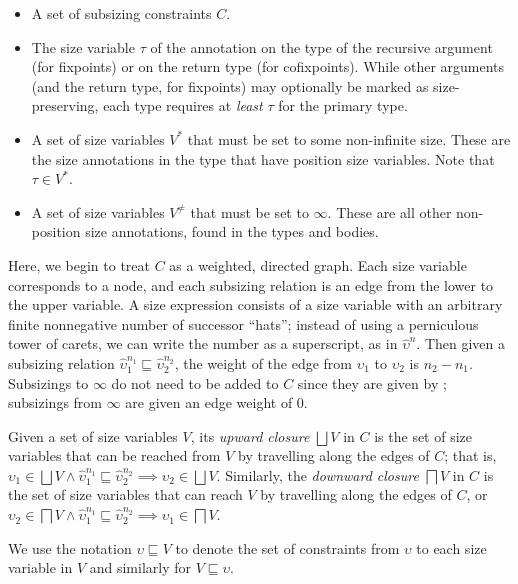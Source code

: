 \begin{itemize}
  \item A set of subsizing constraints $C$.
  \item The size variable $\tau$ of the annotation on the type of the recursive argument (for fixpoints) or on the return type (for cofixpoints). While other arguments (and the return type, for fixpoints) may optionally be marked as size-preserving, each \cofixpoint type requires at \textit{least} $\tau$ for the primary \corecursive type.
  \item A set of size variables $V^*$ that must be set to some non-infinite size.
    These are the size annotations in the \cofixpoint type that have position size variables.
    Note that $\tau \in V^*$.
  \item A set of size variables $V^\neq$ that must be set to $\infty$.
    These are all other non-position size annotations, found in the \cofixpoint types and bodies.
\end{itemize}

Here, we begin to treat $C$ as a weighted, directed graph.
Each size variable corresponds to a node, and each subsizing relation is an edge from the lower to the upper variable.
A size expression consists of a size variable with an arbitrary finite nonnegative number of successor ``hats''; instead of using a perniculous tower of carets, we can write the number as a superscript, as in $\hat{\upsilon}^n$.
Then given a subsizing relation $\hat{\upsilon}_1^{n_1} \sqsubseteq \hat{\upsilon}_2^{n_2}$, the weight of the edge from $\upsilon_1$ to $\upsilon_2$ is $n_2 - n_1$.
Subsizings to $\infty$ do not need to be added to $C$ since they are given by ; subsizings from $\infty$ are given an edge weight of $0$.

Given a set of size variables $V$, its \emph{upward closure} $\bigsqcup V$ in $C$ is the set of size variables that can be reached from $V$ by travelling along the edges of $C$; that is, $\upsilon_1 \in \bigsqcup V \wedge \hat{\upsilon}_1^{n_1} \sqsubseteq \hat{\upsilon}_2^{n_2} \implies \upsilon_2 \in \bigsqcup V$.
Similarly, the \emph{downward closure} $\bigsqcap V$ in $C$ is the set of size variables that can reach $V$ by travelling along the edges of $C$, or $\upsilon_2 \in \bigsqcap V \wedge \hat{\upsilon}_1^{n_1} \sqsubseteq \hat{\upsilon}_2^{n_2} \implies \upsilon_1 \in \bigsqcap V$.

We use the notation $\upsilon \sqsubseteq V$ to denote the set of constraints from $\upsilon$ to each size variable in $V$ and similarly for $V \sqsubseteq \upsilon$.

